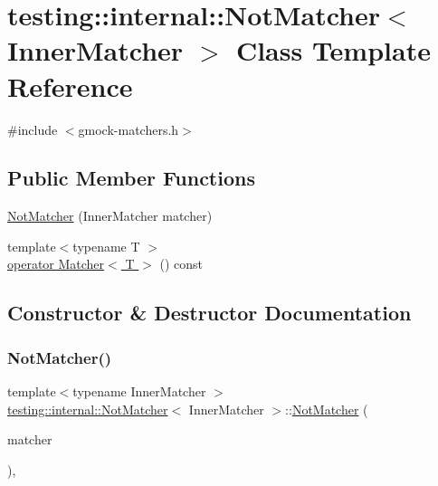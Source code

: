 \hypertarget{classtesting_1_1internal_1_1_not_matcher}{}\section{testing\+:\+:internal\+:\+:Not\+Matcher$<$ Inner\+Matcher $>$ Class Template Reference}
\label{classtesting_1_1internal_1_1_not_matcher}


{\ttfamily \#include $<$gmock-\/matchers.\+h$>$}

\subsection*{Public Member Functions}
\begin{DoxyCompactItemize}
\item 
\hyperlink{classtesting_1_1internal_1_1_not_matcher_a77bd397c9974e4e49acb84eeb624dce1}{Not\+Matcher} (Inner\+Matcher matcher)
\item 
{\footnotesize template$<$typename T $>$ }\\\hyperlink{classtesting_1_1internal_1_1_not_matcher_a87ad7beadf9def58cc053229e99e8625}{operator Matcher$<$ T $>$} () const
\end{DoxyCompactItemize}


\subsection{Constructor \& Destructor Documentation}
\mbox{\label{classtesting_1_1internal_1_1_not_matcher_a77bd397c9974e4e49acb84eeb624dce1}} 
\subsubsection{\texorpdfstring{Not\+Matcher()}{NotMatcher()}}
{\footnotesize\ttfamily template$<$typename Inner\+Matcher $>$ \\
\hyperlink{classtesting_1_1internal_1_1_not_matcher}{testing\+::internal\+::\+Not\+Matcher}$<$ Inner\+Matcher $>$\+::\hyperlink{classtesting_1_1internal_1_1_not_matcher}{Not\+Matcher} (\begin{DoxyParamCaption}\item[{Inner\+Matcher}]{matcher }\end{DoxyParamCaption})\hspace{0.3cm}{\ttfamily [inline]}, {\ttfamily [explicit]}}



